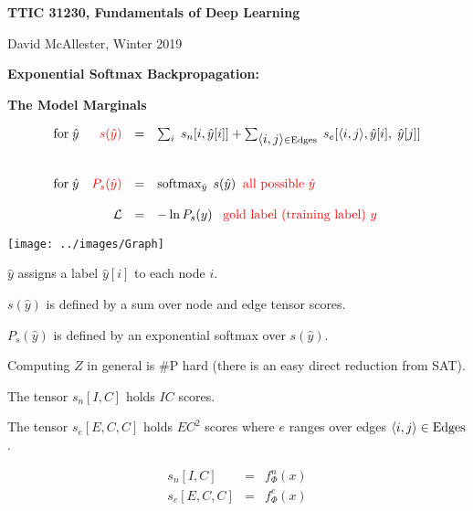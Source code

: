 




{\Huge

  \centerline{\bf TTIC 31230, Fundamentals of Deep Learning}
  \bigskip
  \centerline{David McAllester, Winter 2019}
  \vfill
  \vfill
  \centerline{\bf Exponential Softmax Backpropagation:}
  \vfill
  \centerline{\bf The Model Marginals}
\vfill
\vfill
\vfill


$$\begin{array}{lrcl}
\mbox{for}\;\hat{y} & {\color{red} s(\hat{y})} & = & \sum_i\;s_n[i,\hat{y}[i]] + \sum_{{\mbox{$\langle i,j\rangle$}} \in \mathrm{Edges}}\;s_e[{\mbox{$\langle i,j\rangle$}},\hat{y}[i],\;\hat{y}[j]] \\
\\
\\
\mbox{for}\;\hat{y} & {\color{red} P_s(\hat{y})} & = & \operatorname*{softmax}_{\hat{y}}\;s(\hat{y}) \;\;\mbox{\color{red} all possible $\hat{y}$} \\
\\
 & {\cal L} & = & - \ln P_s(y) \;\;\;{\color{red} \mbox{gold label (training label) $y$}}
\end{array}$$

\centerline{\texttt{[image: ../images/Graph]}}
\medskip
$\hat{y} $ assigns a label $\hat{y}[i]$ to each node $i$.

\vfill
$s(\hat{y})$ is defined by a sum over node and edge tensor scores.

\vfill
$P_s(\hat{y})$ is defined by an exponential softmax over $s(\hat{y})$.

\vfill
Computing $Z$ in general is \#P hard (there is an easy direct reduction from SAT).


The tensor {\color{red} $s_n[I,C]$} holds $IC$ scores.

\vfill
The tensor {\color{red} $s_e[E,C,C]$} holds $EC^2$ scores where $e$ ranges over edges ${\mbox{$\langle i,j\rangle$}} \in \mathrm{Edges}$.


\begin{eqnarray*}
s_n[I,C] & = & f^n_\Phi(x) \\
s_e[E,C,C] & = & f^e_\Phi(x)
\end{eqnarray*}

}
